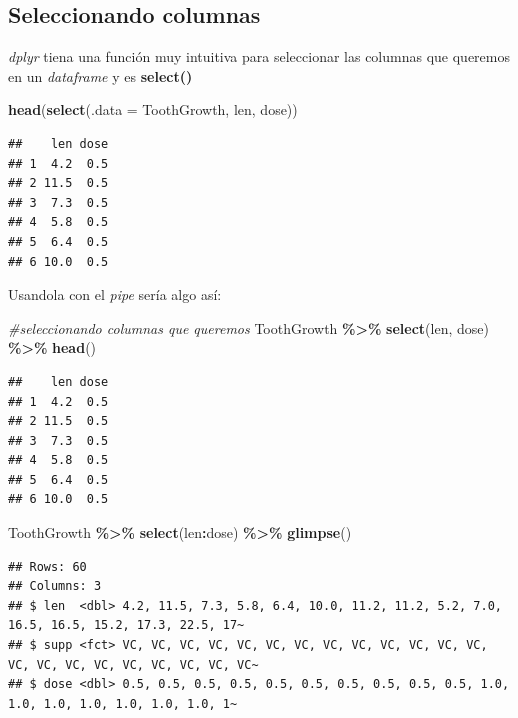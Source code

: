 \documentclass[
]{book}
\newenvironment{Shaded}{\begin{snugshade}}{\end{snugshade}}
\newcommand{\AttributeTok}[1]{\textcolor[rgb]{0.13,0.29,0.53}{#1}}
\newcommand{\CommentTok}[1]{\textcolor[rgb]{0.56,0.35,0.01}{\textit{#1}}}
\newcommand{\FunctionTok}[1]{\textcolor[rgb]{0.13,0.29,0.53}{\textbf{#1}}}
\newcommand{\NormalTok}[1]{#1}
\newcommand{\SpecialCharTok}[1]{\textcolor[rgb]{0.81,0.36,0.00}{\textbf{#1}}}
\begin{document}
\subsection{Seleccionando columnas}\label{seleccionando-columnas-1}

\emph{dplyr} tiena una función muy intuitiva para seleccionar las columnas que queremos en un \emph{dataframe} y es \textbf{select()}

\begin{Shaded}
\begin{Highlighting}[]
\FunctionTok{head}\NormalTok{(}\FunctionTok{select}\NormalTok{(}\AttributeTok{.data =}\NormalTok{ ToothGrowth, len, dose))}
\end{Highlighting}
\end{Shaded}

\begin{verbatim}
##    len dose
## 1  4.2  0.5
## 2 11.5  0.5
## 3  7.3  0.5
## 4  5.8  0.5
## 5  6.4  0.5
## 6 10.0  0.5
\end{verbatim}

Usandola con el \emph{pipe} sería algo así:\\

\begin{Shaded}
\begin{Highlighting}[]
\CommentTok{\#seleccionando columnas que queremos}
\NormalTok{ToothGrowth }\SpecialCharTok{\%\textgreater{}\%} \FunctionTok{select}\NormalTok{(len, dose) }\SpecialCharTok{\%\textgreater{}\%} \FunctionTok{head}\NormalTok{()}
\end{Highlighting}
\end{Shaded}

\begin{verbatim}
##    len dose
## 1  4.2  0.5
## 2 11.5  0.5
## 3  7.3  0.5
## 4  5.8  0.5
## 5  6.4  0.5
## 6 10.0  0.5
\end{verbatim}

\begin{Shaded}
\begin{Highlighting}[]
\NormalTok{ToothGrowth }\SpecialCharTok{\%\textgreater{}\%} \FunctionTok{select}\NormalTok{(len}\SpecialCharTok{:}\NormalTok{dose) }\SpecialCharTok{\%\textgreater{}\%} \FunctionTok{glimpse}\NormalTok{()}
\end{Highlighting}
\end{Shaded}

\begin{verbatim}
## Rows: 60
## Columns: 3
## $ len  <dbl> 4.2, 11.5, 7.3, 5.8, 6.4, 10.0, 11.2, 11.2, 5.2, 7.0, 16.5, 16.5, 15.2, 17.3, 22.5, 17~
## $ supp <fct> VC, VC, VC, VC, VC, VC, VC, VC, VC, VC, VC, VC, VC, VC, VC, VC, VC, VC, VC, VC, VC, VC~
## $ dose <dbl> 0.5, 0.5, 0.5, 0.5, 0.5, 0.5, 0.5, 0.5, 0.5, 0.5, 1.0, 1.0, 1.0, 1.0, 1.0, 1.0, 1.0, 1~
\end{verbatim}
\end{document}
